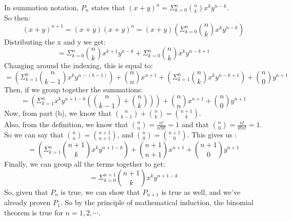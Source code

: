 \begin{itemize}
\begin{itemize}
      In summation notation, $P_n$ states that $(x+y)^n = \Sigma_{k=0}^n \binom{n}{k} x^ky^{n-k}$.\\
      So then:
      $$(x+y)^{n+1} = (x+y)(x+y)^n = (x+y)(\Sigma_{k=0}^n \binom{n}{k} x^ky^{n-k})$$
      Distributing the x and y we get:
      $$= \Sigma_{k=0}^n \binom{n}{k} x^{k+1}y^{n-k} + \Sigma_{k=0}^n \binom{n}{k} x^ky^{n-k+1}$$
      Changing around the indexing, this is equal to:
      $$= (\Sigma_{k=1}^n \binom{n}{k-1} x^k y^{n-(k-1)}) + \binom{n}{n} x^{n+1} + (\Sigma_{k=1}^n \binom{n}{k} x^k y^{n-k+1}) + \binom{n}{0}y^{n+1} $$
      Then, if we group together the summations:
      $$= (\Sigma_{k=1}^n x^k y^{n+1-k} (\binom{n}{k-1} + \binom{n}{k})) + \binom{n}{n} x^{n+1} + \binom{n}{0} y^{n+1}$$
      Now, from part (b), we know that $\binom{n}{k-1} + \binom{n}{k} = \binom{n+1}{k}$.\\
      Also, from the definition, we know that $\binom{n}{n} = \frac{n!}{n!0!} = 1$ and that $\binom{n}{0} = \frac{n!}{0!n!} = 1$. So we can say that $\binom{n}{n} = \binom{n+1}{n+1}$, and $\binom{n}{0} = \binom{n+1}{0}$. This gives us :
      $$= (\Sigma_{k=1}^n \binom{n+1}{k} x^k y^{n+1-k}) + \binom{n+1}{n+1}x^{n+1} + \binom{n+1}{0} y^{n+1}$$
      Finally, we can group all the terms together to get:
      $$= \Sigma_{k=0}^{n+1} \binom{n+1}{k} x^k y^{n+1-k}$$
      So, given that $P_n$ is true, we can show that $P_{n+1}$ is true as well, and we've already proven $P_1$. So by the principle of mathematical induction, the binomial theorem is true for $n = 1, 2, \cdots$.
      
    \end{itemize}
    
\end{itemize}


